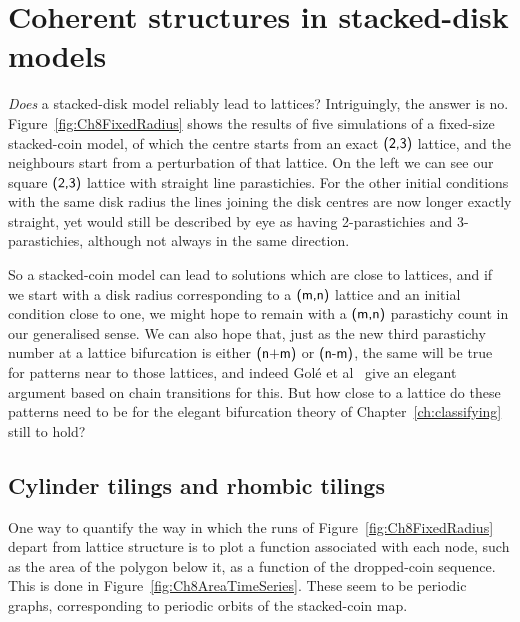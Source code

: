\clearpage
\section{Coherent structures in stacked-disk models}

\textit{Does} a stacked-disk model reliably lead to lattices? Intriguingly, the answer is no. 
Figure~\ref{fig:Ch8FixedRadius} shows the results of five simulations of a fixed-size stacked-coin model, of which the centre starts from an exact $\textsf{(2,3)}$ lattice, and the neighbours start from a perturbation of that lattice.
On the left we can see our square $\textsf{(2,3)}$ lattice with straight line parastichies. For the other initial conditions with the same disk radius the lines joining the disk centres are now longer exactly straight, yet would still be described by eye as having 2-parastichies and 3-parastichies, although not always in the same direction.

So a stacked-coin model can lead to solutions which are close to lattices, and if we start with a disk radius corresponding to a $\textsf{(m,n)}$ lattice and an initial condition close to one, we might  hope to remain with a $\textsf{(m,n)}$ parastichy count in our generalised sense. We can also hope that, just as the new third parastichy number at a lattice bifurcation is either $\textsf{(n+m)}$ or $\textsf{(n-m)}$, the same will be true for patterns near to those lattices, and indeed Golé et al~\cite{goleFibonacciQuasisymmetricPhyllotaxis2016} give an elegant argument based on chain transitions for this. But how close to a lattice do these patterns need to be for  the  elegant bifurcation theory of Chapter~\ref{ch:classifying} still to hold? 


\clearpage
\subsection{Cylinder tilings and rhombic tilings}
\label{sec:tilings}

One way to quantify the way in which the runs of Figure~\ref{fig:Ch8FixedRadius} depart from lattice structure is to plot a function associated with each node, such as the area of the polygon below it,  as a function of the dropped-coin sequence. This is done in Figure~\ref{fig:Ch8AreaTimeSeries}. These seem to be periodic graphs, corresponding to periodic orbits of the stacked-coin map. 


